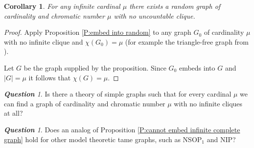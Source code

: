 \documentclass[a4paper]{amsart}
\theoremstyle{plain}
\newtheorem{corollary}[theorem]{Corollary}
\theoremstyle{definition}
\theoremstyle{remark}
\newtheorem{question}[theorem]{\textbf{Question}}
\numberwithin{equation}{section}
\begin{document}
\begin{corollary}
For any infinite cardinal $\mu$ there exists a random graph of cardinality and chromatic number $\mu$ with no uncountable clique. 
\end{corollary}
\begin{proof}
Apply Proposition \ref{P:embed into random} to any graph $G_0$ of cardinality $\mu$ with no infinite clique and $\chi(G_0)=\mu$ (for example the triangle-free graph from \cite{ErRa-triangle-free}).

Let $G$ be the graph supplied by the proposition. Since $G_0$ embeds into $G$ and $|G|=\mu$ it follows that $\chi(G)=\mu$.
\end{proof}


\begin{question}
Is there a theory of simple graphs such that for every cardinal $\mu$ we can find a graph of cardinality and chromatic number $\mu$ with no infinite cliques at all?
\end{question}


\begin{question}
Does an analog of Proposition \ref{P:cannot embed infinite complete graph} hold  for other model theoretic tame graphs, such as NSOP$_1$ and NIP?
\end{question}
\end{document}
